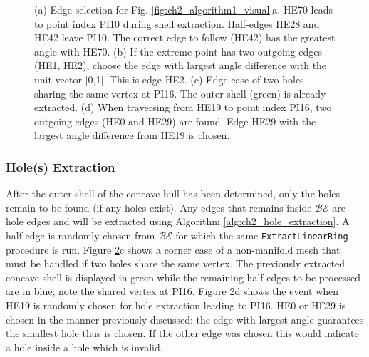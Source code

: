 \begin{figure}[ht]
\begin{subfigure}[t]{.25\linewidth}
    \caption{}
    \label{fig:ch2_example2_choice}
  \end{subfigure}
  \caption[Overview of boundary following procedure]{(a) Edge selection for Fig. \ref{fig:ch2_algorithm1_visual}a.  HE70 leads to point index PI10 during shell extraction. Half-edges HE28 and HE42 leave PI10. The correct edge to follow (HE42) has the greatest angle with HE70. (b) If the extreme point has two outgoing edges (HE1, HE2), choose the edge with largest angle difference with the unit vector [0,1]. This is edge HE2. (c) Edge case of two holes sharing the same vertex at PI16. The outer shell (green) is already extracted. (d) When traversing from HE19 to point index PI16, two outgoing edges (HE0 and HE29) are found. Edge HE29  with the largest angle difference from HE19 is chosen. }
  \label{fig:ch2_example1} 
\end{figure}


\subsubsection{Hole(s) Extraction}

After the outer shell of the concave hull has been determined, only the holes remain to be found (if any holes exist). Any edges that remains inside $\mathcal{BE}$ are hole edges and will be extracted using Algorithm \ref{alg:ch2_hole_extraction}.  A half-edge is randomly chosen from $\mathcal{BE}$ for which the same \texttt{ExtractLinearRing} procedure is run. Figure \ref{fig:ch2_example1}c shows a corner case of a non-manifold mesh that must be handled if two holes share the same vertex. The previously extracted concave shell is displayed in green while the remaining half-edges to be processed are in blue; note the shared vertex at PI16.  Figure \ref{fig:ch2_example1}d shows the event when HE19 is randomly chosen for hole extraction leading to PI16. HE0 or HE29 is chosen in the manner previously discussed: the edge with largest angle guarantees the smallest hole thus is chosen.  If the other edge was chosen this would indicate a hole inside a hole which is invalid.


